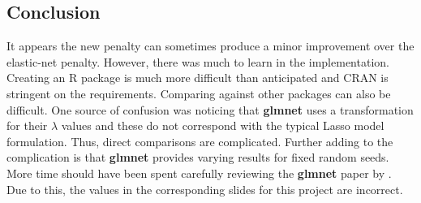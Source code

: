 \documentclass[article]{jss}
\numberwithin{equation}{section}
\begin{document}
\subsection{Conclusion}

It appears the new penalty can sometimes produce a minor improvement over the elastic-net penalty.
However, there was much to learn in the implementation.
Creating an R package is much more difficult than anticipated and CRAN is stringent on the requirements.
Comparing against other packages can also be difficult.
One source of confusion was noticing that \textbf{glmnet} uses a transformation for their $\lambda$ values and these do not correspond with the typical Lasso model formulation. Thus, direct comparisons are complicated. Further adding to the complication is that \textbf{glmnet} provides varying results for fixed random seeds.
More time should have been spent carefully reviewing the \textbf{glmnet} paper by \cite{glmnet}. Due to this, the values in the corresponding slides for this project are incorrect. 



\end{document}
